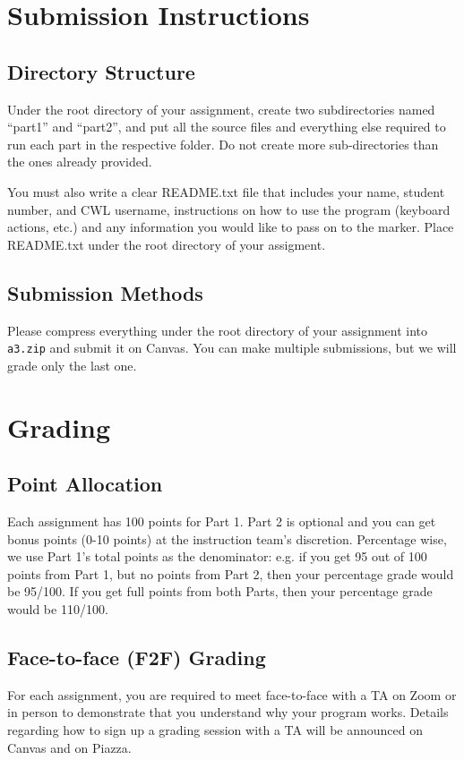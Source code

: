 \documentclass[12pt]{exam}
\begin{document}
\section{Submission Instructions}
\subsection{Directory Structure}
Under the root directory of your assignment, create two subdirectories
named ``part1'' and ``part2'', and put all the source files and everything
else required to run each part in the respective folder. Do not create more
sub-directories than the ones already provided. 

You must also write a clear README.txt file that includes your name,
student number, and CWL username, instructions on how to use the
program (keyboard actions, etc.) and any information you would like to
pass on to the marker. Place README.txt under the root directory of your
assigment.

\subsection{Submission Methods}
Please compress everything under the root directory of your assignment into
{\tt a3.zip} and submit it on Canvas. You can make multiple submissions,
but we will grade only the last one.

\section{Grading}
\subsection{Point Allocation}
Each assignment has 100 points for Part 1. Part 2 is optional and you can get bonus points (0-10 points) at the
instruction team's discretion.
Percentage wise, we use Part 1's total points as the denominator: e.g. if you
get 95 out of 100 points from Part 1, but no points from Part 2, then your percentage
grade would be 95/100. If you get full points from both Parts, then your percentage
grade would be 110/100.

\subsection{Face-to-face (F2F) Grading}
For each assignment, you are required to meet face-to-face with a TA on Zoom or in person
to demonstrate that you understand why your program works. Details regarding how to
sign up a grading session with a TA will be announced on Canvas and on Piazza.
\end{document}
